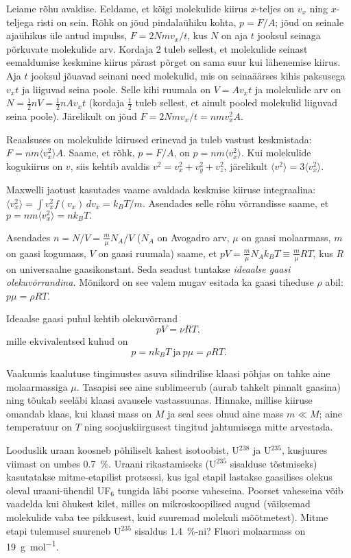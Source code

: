 \documentclass[a4paper,11pt,twocolumn]{article}
\begin{document}
Leiame rõhu avaldise. Eeldame, et kõigi molekulide kiirus \( x \)-teljes on \( v_x \) ning \( x \)-teljega risti on sein. Rõhk on jõud pindalaühiku kohta, \( p=F/A \); jõud on seinale ajaühikus üle antud impulss, \( F=2Nmv_x/t \), kus \( N \) on aja \( t \) jooksul seinaga põrkuvate molekulide arv. Kordaja 2 tuleb sellest, et molekulide seinast eemaldumise keskmine kiirus pärast põrget on sama suur kui lähenemise kiirus. Aja \( t \) jooksul jõuavad seinani need molekulid, mis on seinaäärses kihis paksusega \( v_x t \) ja liiguvad seina poole. Selle kihi ruumala on \( V=Av_xt \) ja molekulide arv on \( N=\frac{1}{2}nV = \frac{1}{2}nAv_xt \) (kordaja \( \frac{1}{2} \) tuleb sellest, et ainult pooled molekulid liiguvad seina poole). Järelikult on jõud \( F=2Nmv_x/t=nmv_{x}^2A \).

Reaalsuses on molekulide kiirused erinevad ja tuleb vastust keskmistada: \( F=nm\langle v_{x}^2 \rangle A \). Saame, et rõhk, \( p=F/A \), on \( p=nm\langle v_{x}^2 \rangle. \) Kui molekulide kogukiirus on \( v \), siis kehtib avaldis \( v^2=v_x^2+v_y^2+v_z^2 \), järelikult \( \langle v^2 \rangle = 3 \langle v_x^2 \rangle \).

Maxwelli jaotust kasutades vaame avaldada keskmise kiiruse integraalina: \( \langle v_x^2 \rangle = \int v_x^2 f(v_x) \, dv_x =k_B T/m \). Asendades selle rõhu võrrandisse saame, et \( p=nm\langle v_{x}^2 \rangle=nk_B T. \)

Asendades \( n=N/V=\frac{m}{\mu}N_A/V \) (\( N_A \) on Avogadro arv, \( \mu \) on gaasi molaarmass, \( m \) on gaasi kogumass, \( V \) on gaasi ruumala) saame, et \( pV=\frac{m}{\mu}N_A k_B T \equiv \frac{m}{\mu}RT \), kus \( R \) on universaalne gaasikonstant. Seda seadust tuntakse \textit{ideaalse gaasi olekuvõrrandina.} Mõnikord on see valem mugav esitada ka gaasi tiheduse \( \rho \) abil: \( p\mu=\rho RT \).

Ideaalse gaasi puhul kehtib olekuvõrrand
\[ pV=\nu RT, \]
mille ekvivalentsed kuhud on
\[ p=n k_B T \ \textrm{ja}\ p\mu=\rho RT. \]

\begin{question}
	Vaakumis kaalutuse tingimustes asuva silindrilise klaasi põhjas on tahke aine molaarmassiga \( \mu \). Tasapisi see aine sublimeerub (aurab tahkelt pinnalt gaasina) ning tõukab seeläbi klaasi avausele vastassuunas. Hinnake, millise kiiruse	omandab klaas, kui klaasi mass on \( M \) ja seal sees olnud aine mass \( m \ll M \); aine temperatuur on \( T \) ning soojuskiirgusest tingitud jahtumisega mitte arvestada.
\end{question}
\begin{question}
	Looduslik uraan koosneb põhiliselt kahest isotoobist, U\( ^{238} \) ja U\( ^{235} \), kusjuures viimast on umbes \SI{0,7}{\percent}. Uraani rikastamiseks (U\( ^{235} \) sisalduse tõstmiseks) kasutatakse mitme-etapilist protsessi, kus igal etapil lastakse gaasilises olekus oleval uraani-ühendil UF\( _{6} \) tungida läbi poorse vaheseina. Poorset vaheseina võib vaadelda kui õhukest kilet, milles on mikroskoopilised augud (väiksemad molekulide vaba tee pikkusest, kuid suuremad molekuli mõõtmetest). Mitme etapi tulemusel suureneb U\( ^{235} \) sisaldus \SI{1,4}{\percent}-ni? Fluori molaarmass on \SI{19}{\g\per\mol}.
\end{question}
\end{document}

